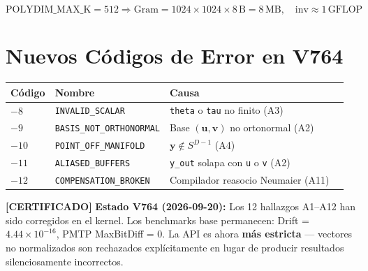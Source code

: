 \begin{equation}
\text{POLYDIM\_MAX\_K} = 512 \Rightarrow \text{Gram} = 1024 \times 1024 \times 8\,\text{B} = 8\,\text{MB}, \quad \text{inv} \approx 1\,\text{GFLOP}
\end{equation}

\section{Nuevos Códigos de Error en V764}

\begin{tabular}{llll}
\hline
\textbf{Código} & \textbf{Nombre} & \textbf{Causa} \\
\hline
$-8$ & \texttt{INVALID\_SCALAR} & \texttt{theta} o \texttt{tau} no finito (A3) \\
$-9$ & \texttt{BASIS\_NOT\_ORTHONORMAL} & Base $(\mathbf{u}, \mathbf{v})$ no ortonormal (A2) \\
$-10$ & \texttt{POINT\_OFF\_MANIFOLD} & $\mathbf{y} \notin S^{D-1}$ (A4) \\
$-11$ & \texttt{ALIASED\_BUFFERS} & \texttt{y\_out} solapa con \texttt{u} o \texttt{v} (A2) \\
$-12$ & \texttt{COMPENSATION\_BROKEN} & Compilador reasocio Neumaier (A11) \\
\hline


\end{tabular}

\textbf{[CERTIFICADO]} 
\textbf{Estado V764 (2026-09-20):} Los 12 hallazgos A1--A12 han sido corregidos
en el kernel. Los benchmarks base permanecen: Drift = $4.44 \times 10^{-16}$,
PMTP MaxBitDiff = 0. La API es ahora \textbf{más estricta} --- vectores no normalizados
son rechazados explícitamente en lugar de producir resultados silenciosamente incorrectos.

